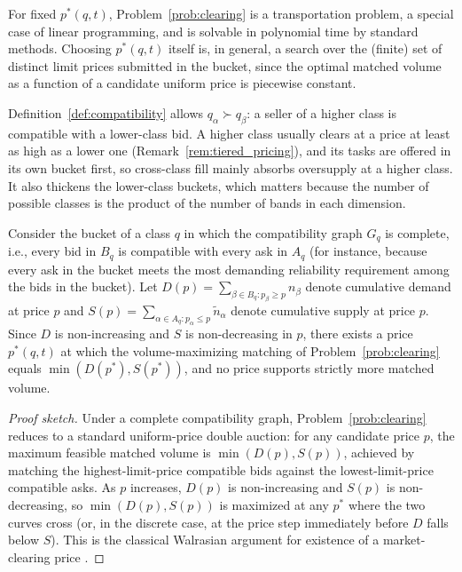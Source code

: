 For fixed $p^*(q, t)$, Problem~\ref{prob:clearing} is a transportation
problem, a special case of linear programming, and is solvable in
polynomial time by standard methods. Choosing $p^*(q, t)$ itself is, in
general, a search over the (finite) set of distinct limit prices submitted
in the bucket, since the optimal matched volume as a function of a
candidate uniform price is piecewise constant.

\begin{remark}
\label{rem:tier_generalization}
Definition~\ref{def:compatibility} allows $q_\alpha \succ q_\beta$: a seller
of a higher class is compatible with a lower-class bid. A higher class
usually clears at a price at least as high as a lower one
(Remark~\ref{rem:tiered_pricing}), and its tasks are offered in its own
bucket first, so cross-class fill mainly absorbs oversupply at a higher
class. It also thickens the lower-class buckets, which matters because the
number of possible classes is the product of the number of bands in each
dimension.
\end{remark}

\begin{proposition}
\label{prop:existence}
Consider the bucket of a class $q$ in which the compatibility graph $G_q$
is complete, i.e., every bid in $B_q$ is compatible with every ask in $A_q$
(for instance, because every ask in the bucket meets the most demanding
reliability requirement among the bids in the bucket). Let
$D(p) = \sum_{\beta \in B_q : p_\beta \geq p} n_\beta$ denote cumulative
demand at price $p$ and $S(p) = \sum_{\alpha \in A_q : p_\alpha \leq p}
\tilde n_\alpha$ denote cumulative supply at price $p$. Since $D$ is
non-increasing and $S$ is non-decreasing in $p$, there exists a price
$p^*(q, t)$ at which the volume-maximizing matching of
Problem~\ref{prob:clearing} equals $\min(D(p^*), S(p^*))$, and no price
supports strictly more matched volume.
\end{proposition}

\begin{proof}[Proof sketch]
Under a complete compatibility graph, Problem~\ref{prob:clearing} reduces
to a standard uniform-price double auction: for any candidate price $p$,
the maximum feasible matched volume is $\min(D(p), S(p))$, achieved by
matching the highest-limit-price compatible bids against the
lowest-limit-price compatible asks. As $p$ increases, $D(p)$ is
non-increasing and $S(p)$ is non-decreasing, so $\min(D(p), S(p))$ is
maximized at any $p^*$ where the two curves cross (or, in the discrete
case, at the price step immediately before $D$ falls below $S$). This is
the classical Walrasian argument for existence of a market-clearing price
\cite{mcafee1992}.
\end{proof}

